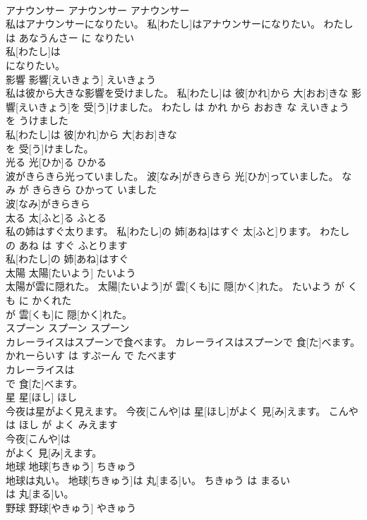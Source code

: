 \documentclass[8pt]{extreport}
\begin{document}
\begin{CJK}{UTF8}{min}
\\	アナウンサー	アナウンサー	アナウンサー	
\\	私はアナウンサーになりたい。	私[わたし]はアナウンサーになりたい。	わたし は あなうんさー に なりたい	
\\	私[わたし]は
\\	になりたい。			
\\	影響	影響[えいきょう]	えいきょう	
\\	私は彼から大きな影響を受けました。	私[わたし]は 彼[かれ]から 大[おお]きな 影響[えいきょう]を 受[う]けました。	わたし は かれ から おおき な えいきょう を うけました	
\\	私[わたし]は 彼[かれ]から 大[おお]きな
\\	を 受[う]けました。			
\\	光る	光[ひか]る	ひかる	
\\	波がきらきら光っていました。	波[なみ]がきらきら 光[ひか]っていました。	なみ が きらきら ひかって いました	
\\	波[なみ]がきらきら
\\	太る	太[ふと]る	ふとる	
\\	私の姉はすぐ太ります。	私[わたし]の 姉[あね]はすぐ 太[ふと]ります。	わたし の あね は すぐ ふとります	
\\	私[わたし]の 姉[あね]はすぐ
\\	太陽	太陽[たいよう]	たいよう	
\\	太陽が雲に隠れた。	太陽[たいよう]が 雲[くも]に 隠[かく]れた。	たいよう が くも に かくれた	
\\	が 雲[くも]に 隠[かく]れた。			
\\	スプーン	スプーン	スプーン	
\\	カレーライスはスプーンで食べます。	カレーライスはスプーンで 食[た]べます。	かれーらいす は すぷーん で たべます	
\\	カレーライスは
\\	で 食[た]べます。			
\\	星	星[ほし]	ほし	
\\	今夜は星がよく見えます。	今夜[こんや]は 星[ほし]がよく 見[み]えます。	こんや は ほし が よく みえます	
\\	今夜[こんや]は
\\	がよく 見[み]えます。			
\\	地球	地球[ちきゅう]	ちきゅう	
\\	地球は丸い。	地球[ちきゅう]は 丸[まる]い。	ちきゅう は まるい	
\\	は 丸[まる]い。			
\\	野球	野球[やきゅう]	やきゅう	

\end{CJK}
\end{document}
